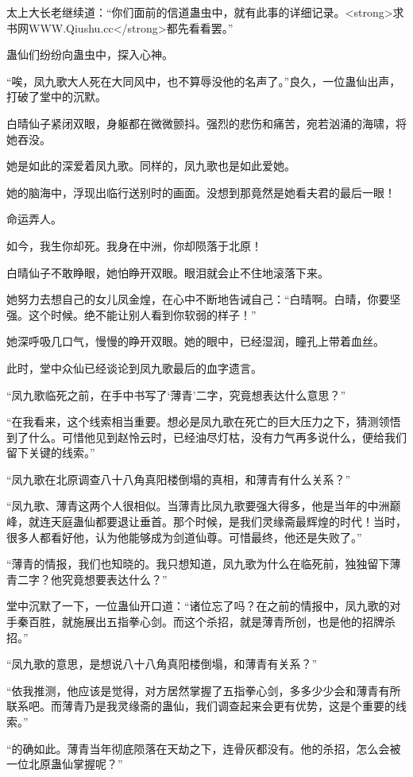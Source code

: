 \begin{this_body}
太上大长老继续道：“你们面前的信道蛊虫中，就有此事的详细记录。<strong>求书网WWW.Qiushu.cc</strong>都先看看罢。”

蛊仙们纷纷向蛊虫中，探入心神。

“唉，凤九歌大人死在大同风中，也不算辱没他的名声了。”良久，一位蛊仙出声，打破了堂中的沉默。

白晴仙子紧闭双眼，身躯都在微微颤抖。强烈的悲伤和痛苦，宛若汹涌的海啸，将她吞没。

她是如此的深爱着凤九歌。同样的，凤九歌也是如此爱她。

她的脑海中，浮现出临行送别时的画面。没想到那竟然是她看夫君的最后一眼！

命运弄人。

如今，我生你却死。我身在中洲，你却陨落于北原！

白晴仙子不敢睁眼，她怕睁开双眼。眼泪就会止不住地滚落下来。

她努力去想自己的女儿凤金煌，在心中不断地告诫自己：“白晴啊。白晴，你要坚强。这个时候。绝不能让别人看到你软弱的样子！”

她深呼吸几口气，慢慢的睁开双眼。她的眼中，已经湿润，瞳孔上带着血丝。

此时，堂中众仙已经谈论到凤九歌最后的血字遗言。

“凤九歌临死之前，在手中书写了‘薄青’二字，究竟想表达什么意思？”

“在我看来，这个线索相当重要。想必是凤九歌在死亡的巨大压力之下，猜测领悟到了什么。可惜他见到赵怜云时，已经油尽灯枯，没有力气再多说什么，便给我们留下关键的线索。”

“凤九歌在北原调查八十八角真阳楼倒塌的真相，和薄青有什么关系？”

“凤九歌、薄青这两个人很相似。当薄青比凤九歌要强大得多，他是当年的中洲巅峰，就连天庭蛊仙都要退让垂首。那个时候，是我们灵缘斋最辉煌的时代！当时，很多人都看好他，认为他能够成为剑道仙尊。可惜最终，他还是失败了。”

“薄青的情报，我们也知晓的。我只想知道，凤九歌为什么在临死前，独独留下薄青二字？他究竟想要表达什么？”

堂中沉默了一下，一位蛊仙开口道：“诸位忘了吗？在之前的情报中，凤九歌的对手秦百胜，就施展出五指拳心剑。而这个杀招，就是薄青所创，也是他的招牌杀招。”

“凤九歌的意思，是想说八十八角真阳楼倒塌，和薄青有关系？”

“依我推测，他应该是觉得，对方居然掌握了五指拳心剑，多多少少会和薄青有所联系吧。而薄青乃是我灵缘斋的蛊仙，我们调查起来会更有优势，这是个重要的线索。”

“的确如此。薄青当年彻底陨落在天劫之下，连骨灰都没有。他的杀招，怎么会被一位北原蛊仙掌握呢？”


\end{this_body}
